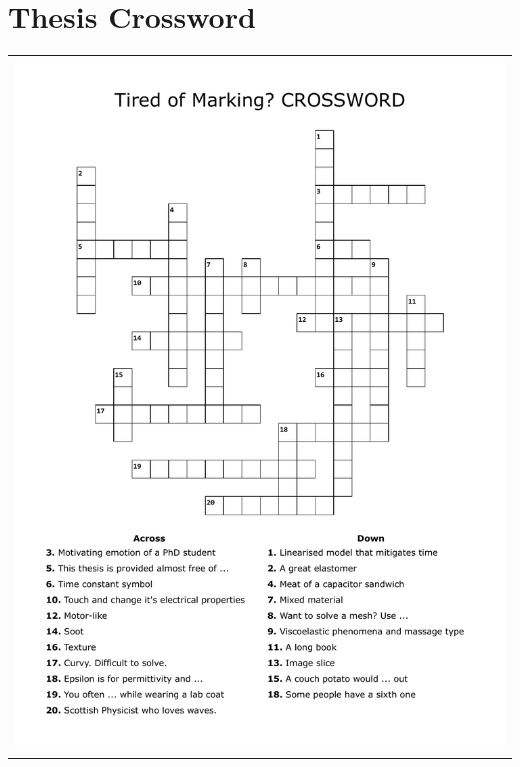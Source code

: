 \chapter{Thesis Crossword}
\label{appendix-A}
\vspace{-2cm}
\begin{table}[H]
	\centering
	\begin{tabular}{p{\linewidth}}
		\hspace{1cm}
		\includegraphics[width=0.85\linewidth]{fun-thesis-crossword.pdf}
	\end{tabular}
\end{table}
%
